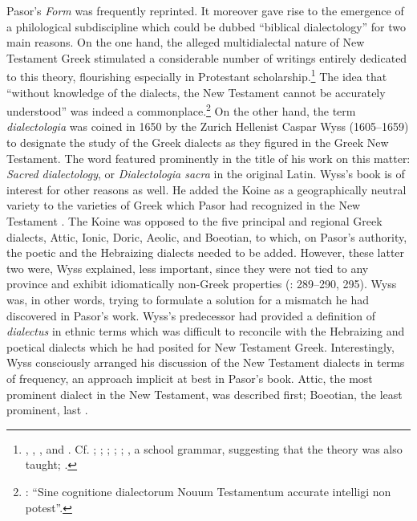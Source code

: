 Pasor’s \textit{Form} was frequently reprinted. It moreover gave rise to the emergence of a philological subdiscipline which could be dubbed “biblical dialectology” for two main reasons. On the one hand, the alleged multidialectal nature of New Testament Greek stimulated a considerable number of writings entirely dedicated to this theory, flourishing especially in Protestant scholarship.\footnote{\citet{Wyss1650}, \citet{Olearius1668}, \citet{Leusden1670}, and \citet{Nibbe1755}. Cf. \citet[347]{Parr1686}; \citet[18--19]{Von1705}; \citet[9--10]{Florinus1707}; \citet[\textsc{d.2}\textsc{\textsuperscript{r}}; \textsc{d.5}\textsc{\textsuperscript{v}}]{Thryllitsch1709}; \citet[18]{Reinhard1724}; \citet[121--122]{Holmes1735}, a school grammar, suggesting that the theory was also taught; \citet[136--137]{Walch1772}.} The idea that “without knowledge of the dialects, the New Testament cannot be accurately understood” was indeed a commonplace.\footnote{\citet[\textsc{d.5}\textsc{\textsuperscript{v}}]{Thryllitsch1709}: “Sine cognitione dialectorum Nouum Testamentum accurate intelligi non potest”.} On the other hand, the term \textit{dialectologia} was coined in 1650 by the Zurich Hellenist Caspar Wyss (1605–1659) to designate the study of the Greek dialects as they figured in the Greek New Testament. The word featured prominently in the title of his work on this matter: \textit{Sacred dialectology}, or \textit{Dialectologia sacra} in the original Latin. Wyss’s book is of interest for other reasons as well. He added the Koine as a geographically neutral variety to the varieties of Greek which Pasor had recognized in the New Testament \citep[3]{Wyss1650}. The Koine was opposed to the five principal and regional Greek dialects, Attic, Ionic, Doric, Aeolic, and Boeotian, to which, on Pasor’s authority, the poetic and the Hebraizing dialects needed to be added. However, these latter two were, Wyss explained, less important, since they were not tied to any province and exhibit idiomatically non-Greek properties (\citealt{Wyss1650}: 289–290, 295). Wyss was, in other words, trying to formulate a solution for a mismatch he had discovered in Pasor’s work. Wyss’s predecessor had provided a definition of \textit{dialectus} in ethnic terms which was difficult to reconcile with the Hebraizing and poetical dialects which he had posited for New Testament Greek. Interestingly, Wyss consciously arranged his discussion of the New Testament dialects in terms of frequency, an approach implicit at best in Pasor’s book. Attic, the most prominent dialect in the New Testament, was described first; Boeotian, the least prominent, last \citep[4]{Wyss1650}.

